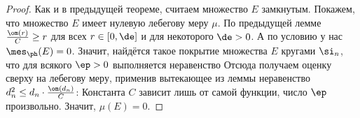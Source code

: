 \documentclass[a4paper]{article}
\begin{document}
\begin{proof}
Как и в предыдущей теореме, считаем множество $E$ замкнутым. Покажем, что множество $E$ имеет нулевую лебегову
меру $\mu$. По предыдущей лемме $\frac{\om(r)}{C} \ge r$ для всех $r\in[0,\de]$ и для некоторого $\de>0$.
А по условию у нас $\mes_\ph(E)=0$. Значит, найдётся такое покрытие множества
$E$ кругами $\si_n$, что для всякого $\ep > 0$ выполняется неравенство
Отсюда получаем оценку сверху на лебегову меру, применив вытекающее из леммы неравенство $d_n^2\le d_n \cdot\frac{\om(d_n)}{C}$:
Константа $C$ зависит лишь от самой функции, число $\ep$ произвольно. Значит, $\mu(E)=0$.


\end{proof}
\end{document}
